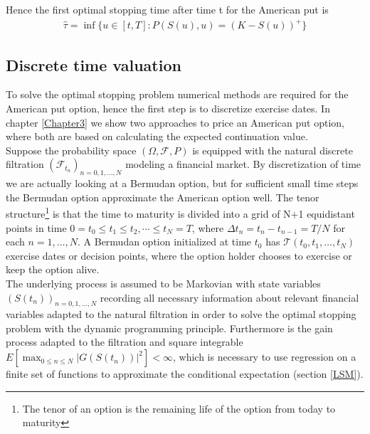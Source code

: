 Hence the first optimal stopping time after time t for the American put is
\begin{equation*}
\begin{split}
\hat{\tau}= \inf\{u \in [t,T] : P(S(u),u) = (K-S(u))^+ \}
\end{split}
\end{equation*}

\subsection{Discrete time valuation}\label{DiscreteValueFramework}
To solve the optimal stopping problem numerical methods are required for the American put option, hence the first step is to discretize exercise dates. In chapter \ref{Chapter3} we show two approaches to price an American put option, where both are based on calculating the expected continuation value. \\

Suppose the probability space $(\Omega, \mathcal{F}, P)$ is equipped with the natural discrete filtration $(\mathcal{F}_{t_n})_{n=0,1,\ldots,N}$ modeling a financial market. By discretization of time we are actually looking at a Bermudan option, but for sufficient small time steps the Bermudan option approximate the American option well. The tenor structure\footnote{The tenor of an option is the remaining life of the option from today to maturity} is that the time to maturity is divided into a grid of N+1 equidistant points in time $0=t_0\leq t_1\leq t_2, \cdots \leq t_N=T$, where $\Delta t_n = t_n-t_{n-1}=T/N$ for each $n=1, \ldots, N$. A Bermudan option initialized at time $t_0$ has $\mathcal{T}(t_0,t_1,\ldots,t_N)$ exercise dates or decision points, where the option holder chooses to exercise or keep the option alive. \\

The underlying process is assumed to be Markovian with state variables $(S(t_n))_{n=0,1,\ldots,N}$ recording all necessary information about relevant financial variables adapted to the natural filtration in order to solve the optimal stopping problem with the dynamic programming principle. Furthermore is the gain process adapted to the filtration and square integrable $E[\max_{0\leq n \leq N} |G(S(t_n))|^2]<\infty$, which is necessary to use regression on a finite set of functions to approximate the conditional expectation (section \ref{LSM}).\\

